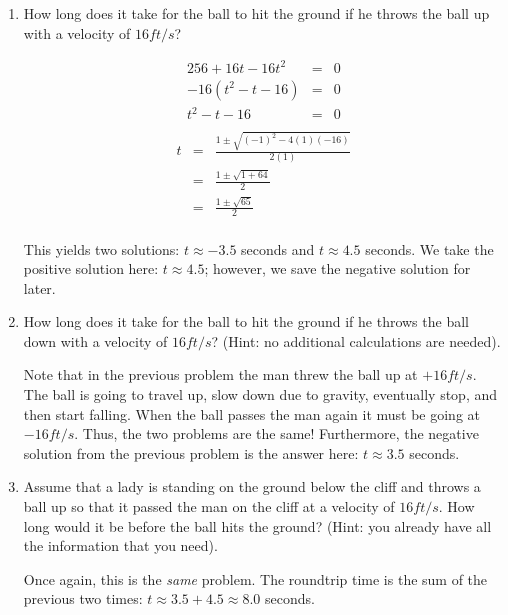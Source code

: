 \documentclass[letterpaper,12pt,fleqn]{article}
\begin{document}
\begin{enumerate}
\begin{enumerate}
\item How long does it take for the ball to hit the ground if he throws the
ball up with a velocity of $16 ft/s$?

\begin{eqnarray*}
256+16t-16t^2 &=& 0 \\
-16(t^2-t-16) &=& 0 \\
t^2-t-16 &=& 0 \\
\end{eqnarray*}
\begin{eqnarray*}
t &=& \frac{1\pm\sqrt{(-1)^2-4(1)(-16)}}{2(1)} \\
    &=& \frac{1\pm\sqrt{1+64}}{2} \\
    &=& \frac{1\pm\sqrt{65}}{2} \\
\end{eqnarray*}

This yields two solutions: $t\approx-3.5$ seconds and $t\approx4.5$ seconds.
We take the positive solution here: $t\approx4.5$; however, we save the
negative solution for later.

\bigskip

\item How long does it take for the ball to hit the ground if he throws the
ball down with a velocity of $16 ft/s$? (Hint: no additional calculations are
needed).

\bigskip

Note that in the previous problem the man threw the ball up at $+16 ft/s$. The
ball is going to travel up, slow down due to gravity, eventually stop, and then
start falling. When the ball passes the man again it must be going at
$-16 ft/s$. Thus, the two problems are the same! Furthermore, the negative
solution from the previous problem is the answer here: $t\approx3.5$ seconds.

\bigskip

\item Assume that a lady is standing on the ground below the cliff and throws
a ball up so that it passed the man on the cliff at a velocity of $16 ft/s$.
How long would it be before the ball hits the ground? (Hint: you already have
all the information that you need).

Once again, this is the \emph{same} problem. The roundtrip time is the sum of
the previous two times: $t\approx3.5+4.5\approx8.0$ seconds.
\end{enumerate}

\bigskip


\end{enumerate}
\end{document}
